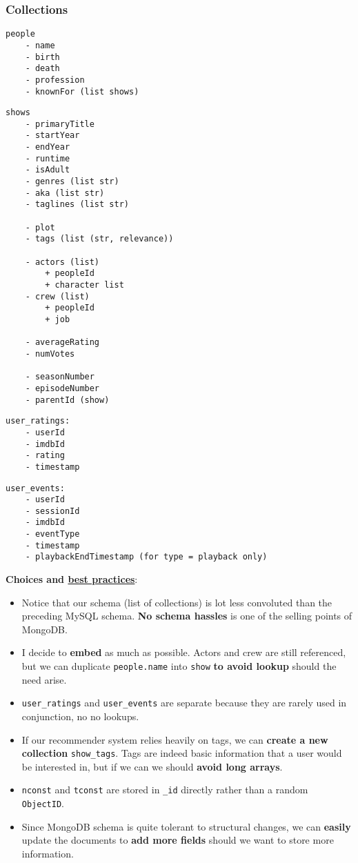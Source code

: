 \documentclass[10pt,titlepage]{article}
\begin{document}
\subsubsection{Collections}

\begin{lstlisting}
people
    - name
    - birth
    - death
    - profession
    - knownFor (list shows)
\end{lstlisting}

\begin{lstlisting}
shows
    - primaryTitle
    - startYear
    - endYear
    - runtime
    - isAdult
    - genres (list str)
    - aka (list str)
    - taglines (list str)

    - plot
    - tags (list (str, relevance))

    - actors (list)
        + peopleId
        + character list
    - crew (list)
        + peopleId
        + job

    - averageRating
    - numVotes

    - seasonNumber
    - episodeNumber
    - parentId (show)
\end{lstlisting}
\begin{lstlisting}
user_ratings:
    - userId
    - imdbId
    - rating
    - timestamp
\end{lstlisting}
\begin{lstlisting}
user_events:
    - userId
    - sessionId
    - imdbId
    - eventType
    - timestamp
    - playbackEndTimestamp (for type = playback only)
\end{lstlisting}

\textbf{Choices and \href{https://www.mongodb.com/developer/products/mongodb/mongodb-schema-design-best-practices/}{best
practices}}:
\begin{itemize}
    \item Notice that our schema (list of collections) is lot less convoluted than the preceding MySQL schema.
        \textbf{No schema hassles} is one of the selling points of MongoDB.
    \item I decide to \textbf{embed} as much as possible. Actors and crew are still referenced, but we can duplicate
        \texttt{people.name} into \texttt{show} \textbf{to avoid lookup} should the need arise.
    \item \texttt{user\_ratings} and \texttt{user\_events} are separate because they are rarely used in conjunction, no
        no lookups.
    \item If our recommender system relies heavily on tags, we can \textbf{create a new collection} \texttt{show\_tags}.
        Tags are indeed basic information that a user would be interested in, but if we can we should \textbf{avoid long
        arrays}.
    \item \texttt{nconst} and \texttt{tconst} are stored in \texttt{\_id} directly rather than a random \texttt{ObjectID}.
    \item Since MongoDB schema is quite tolerant to structural changes, we can \textbf{easily} update the documents to
        \textbf{add more fields} should we want to store more information.
\end{itemize}
\end{document}
